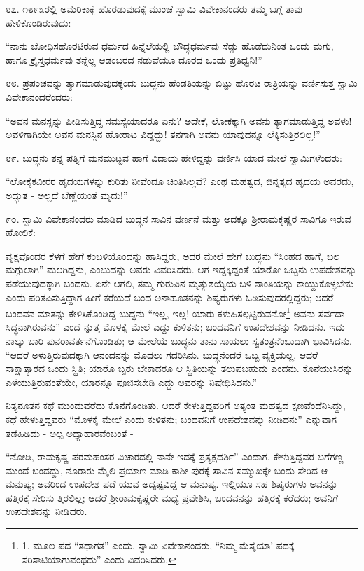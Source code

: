 ೮೭. ೧೮೯೩ರಲ್ಲಿ ಅಮೆರಿಕಾಕ್ಕೆ ಹೊರಡುವುದಕ್ಕೆ ಮುಂಚೆ ಸ್ವಾಮಿ ವಿವೇಕಾನಂದರು ತಮ್ಮ ಬಗ್ಗೆ ತಾವು ಹೇಳಿಕೊಂಡಿರುವುದು:

“ನಾನು ಬೋಧಿಸಹೊರಟಿರುವ ಧರ್ಮದ ಹಿನ್ನೆಲೆಯಲ್ಲಿ ಬೌದ್ಧಧರ್ಮವು ಸೆಡ್ಡು ಹೊಡೆದುನಿಂತ ಒಂದು ಮಗು, ಹಾಗೂ ಕ್ರೈಸ್ತಧರ್ಮವು ತನ್ನೆಲ್ಲ ಆಡಂಬರದ ನಡುವೆಯೂ ದೂರದ ಒಂದು ಪ್ರತಿಧ್ವನಿ!” 

೮೮. ಪ್ರಪಂಚವನ್ನು ತ್ಯಾಗಮಾಡುವುದಕ್ಕೆಂದು ಬುದ್ಧನು ಹೆಂಡತಿಯನ್ನು ಬಿಟ್ಟು ಹೊರಟ ರಾತ್ರಿಯನ್ನು ವರ್ಣಿಸುತ್ತ ಸ್ವಾಮಿ ವಿವೇಕಾನಂದರೆಂದರು:

“ಅವನ ಮನಸ್ಸನ್ನು ಪೀಡಿಸುತ್ತಿದ್ದ ಸಮಸ್ಯೆಯಾದರೂ ಏನು? ಅದೇಕೆ, ಲೋಕಕ್ಕಾಗಿ ಅವನು ತ್ಯಾಗಮಾಡುತ್ತಿದ್ದ ಅವಳು! ಅವಳಿಗಾಗಿಯೇ ಅವನ ಮನಸ್ಸಿನ ಹೋರಾಟ ವಿದ್ದದ್ದು! ತನಗಾಗಿ ಅವನು ಯಾವುದನ್ನೂ ಲೆಕ್ಕಿಸುತ್ತಿರಲಿಲ್ಲ!” 

೮೯. ಬುದ್ಧನು ತನ್ನ ಪತ್ನಿಗೆ ಮನಮುಟ್ಟವ ಹಾಗೆ ವಿದಾಯ ಹೇಳಿದ್ದನ್ನು ವರ್ಣಿಸಿ ಯಾದ ಮೇಲೆ ಸ್ವಾಮಿಗಳೆಂದರು:

“ಲೋಕೈಕವೀರರ ಹೃದಯಗಳನ್ನು ಕುರಿತು ನೀವೆಂದೂ ಚಿಂತಿಸಿಲ್ಲವೆ? ಎಂಥ ಮಹತ್ವದ, ಔನ್ನತ್ಯದ ಹೃದಯ ಅವರದು, ಅದ್ಭುತ - ಅಲ್ಲದೆ ಬೆಣ್ಣೆಯಂತೆ ಮೃದು!” 

೯೦. ಸ್ವಾಮಿ ವಿವೇಕಾನಂದರು ಮಾಡಿದ ಬುದ್ಧನ ಸಾವಿನ ವರ್ಣನೆ ಮತ್ತು ಅದಕ್ಕೂ ಶ‍್ರೀರಾಮಕೃಷ್ಣರ ಸಾವಿಗೂ ಇರುವ ಹೋಲಿಕೆ:

ವೃಕ್ಷವೊಂದರ ಕೆಳಗೆ ಹೇಗೆ ಕಂಬಳಿಯೊಂದನ್ನು ಹಾಸಿದ್ದರು, ಅದರ ಮೇಲೆ ಹೇಗೆ ಬುದ್ಧನು “ಸಿಂಹದ ಹಾಗೆ, ಬಲ ಮಗ್ಗುಲಾಗಿ” ಮಲಗಿದ್ದನು, ಎಂಬುದನ್ನು ಅವರು ವಿವರಿಸಿದರು. ಆಗ ಇದ್ದಕ್ಕಿದ್ದಂತೆ ಯಾರೋ ಒಬ್ಬನು ಉಪದೇಶವನ್ನು ಪಡೆಯುವುದಕ್ಕಾಗಿ ಬಂದನು. ಏನೇ ಆಗಲಿ, ತಮ್ಮ ಗುರುವಿನ ಮೃತ್ಯುಶಯ್ಯೆಯ ಬಳಿ ಶಾಂತಿಯನ್ನು ಕಾಯ್ದುಕೊಳ್ಳಬೇಕು ಎಂದು ಪರಿತಪಿಸುತ್ತಿದ್ದಾಗ ಹೀಗೆ ಕರೆಯದೆ ಬಂದ ಅನಾಹೂತನನ್ನು ಶಿಷ್ಯರುಗಳು ಓಡಿಸುವುದರಲ್ಲಿದ್ದರು; ಆದರೆ ಬಂದವನ ಮಾತನ್ನು ಕೇಳಿಸಿಕೊಂಡಿದ್ದ ಬುದ್ಧನು “ಇಲ್ಲ, ಇಲ್ಲ! ಯಾರು ಕಳುಹಿಸಲ್ಪಟ್ಟಿರುವನೋ\footnote{1. ಮೂಲ ಪದ “ತಥಾಗತ” ಎಂದು. ಸ್ವಾಮಿ ವಿವೇಕಾನಂದರು, “ನಿಮ್ಮ ಮೆಸೈಯಾ’  ಪದಕ್ಕೆ ಸರಿಸಾಟಿಯಾಗುವಂಥದು” ಎಂದು ವಿವರಿಸಿದರು.} ಅವನು ಸರ್ವದಾ ಸಿದ್ಧನಾಗಿರುವನು” ಎಂದೆ ನ್ನುತ್ತ ಮೊಳಕೈ ಮೇಲೆ ಎದ್ದು ಕುಳಿತನು; ಬಂದವನಿಗೆ ಉಪದೇಶವನ್ನು ನೀಡಿದನು. ಇದು ನಾಲ್ಕು ಬಾರಿ ಪುನರಾವರ್ತನೆಗೊಂಡಿತು; ಆ ಮೇಲೆಯೆ ಬುದ್ಧನು ತಾನು ಸಾಯಲು ಸ್ವತಂತ್ರನೆಂಬುದಾಗಿ ಭಾವಿಸಿದನು. “ಆದರೆ ಅಳುತ್ತಿರುವುದಕ್ಕಾಗಿ ಆನಂದನನ್ನು ಮೊದಲು ಗದರಿಸಿನು. ಬುದ್ಧನೆಂದರೆ ಒಬ್ಬ ವ್ಯಕ್ತಿಯಲ್ಲ, ಆದರೆ ಸಾಕ್ಷಾತ್ಕಾರದ ಒಂದು ಸ್ಥಿತಿ; ಯಾರೊ ಬ್ಬರು ಬೇಕಾದರೂ ಆ ಸ್ಥಿತಿಯನ್ನು ತಲುಪಬಹುದು ಎಂದನು. ಕೊನೆಯುಸಿರನ್ನು ಎಳೆಯುತ್ತಿರುವಂತೆಯೇ, ಯಾರನ್ನೂ ಪೂಜಿಸಬೇಡಿ ಎದ್ದು ಅವರನ್ನು ನಿಷೇಧಿಸಿದನು.”

ನಿತ್ಯನೂತನ ಕಥೆ ಮುಂದುವರೆದು ಕೊನೆಗೊಂಡಿತು. ಆದರೆ ಕೇಳುತ್ತಿದ್ದವರಿಗೆ ಅತ್ಯಂತ ಮಹತ್ವದ ಕ್ಷಣವೆಂದೆನಿಸಿದ್ದು, ಕಥೆ ಹೇಳುತ್ತಿದ್ದವರು “ಮೊಳಕೈ ಮೇಲೆ ಎಂದು ಕುಳಿತನು; ಬಂದವನಿಗೆ ಉಪದೇಶವನ್ನು ನೀಡಿದನು” ಎನ್ನುವಾಗ ತಡೆಹಿಡಿದು - ಅಲ್ಪ ಅಧ್ಯಾಹಾರವೆಂಬಂತೆ -

“ನೋಡಿ, ರಾಮಕೃಷ್ಣ ಪರಮಹಂಸರ ವಿಚಾರದಲ್ಲಿ ನಾನೇ ಇದಕ್ಕೆ ಪ್ರತ್ಯಕ್ಷದರ್ಶಿ” ಎಂದಾಗ, ಕೇಳುತ್ತಿದ್ದವರ ಬಗೆಗಣ್ಣ ಮುಂದೆ ಬಂದದ್ದು, ನೂರಾರು ಮೈಲಿ ಪ್ರಯಾಣ ಮಾಡಿ ಕಾಶೀ ಪುರಕ್ಕೆ ಸಾವಿನ ಸಮ್ಮುಖಕ್ಕೇ ಬಂದು ಸೇರಿದ ಆ ಮನುಷ್ಯ; ಅವರಿಂದ ಉಪದೇಶ ಪಡೆ ಯುವ ಅದೃಷ್ಟವಿದ್ದ ಆ ಮನುಷ್ಯ. ಇಲ್ಲಿಯೂ ಸಹ ಶಿಷ್ಯರುಗಳು ಅವನನ್ನು ಹತ್ತಿರಕ್ಕೆ ಸೇರಿಸು ತ್ತಿರಲಿಲ್ಲ; ಆದರೆ ಶ‍್ರೀರಾಮಕೃಷ್ಣರೇ ಮಧ್ಯೆ ಪ್ರವೇಶಿಸಿ, ಬಂದವನನ್ನು ಹತ್ತಿರಕ್ಕೆ ಕರೆದರು; ಅವನಿಗೆ ಉಪದೇಶವನ್ನು ನೀಡಿದರು. 

